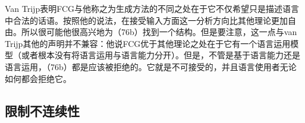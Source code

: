 Van Trijp表明FCG与他称之为生成方法的不同之处在于它不仅希望只是描述语言中合法的话语。按照他的说法，在接受输入方面这一分析方向比其他理论更加自由。所以很可能他很高兴地为（76b）找到一个结构。但是要注意，这一点与van Trijp其他的声明并不兼容：他说FCG优于其他理论之处在于它有一个语言运用模型（或者根本没有将语言运用与语言能力分开）。但是，不管是基于语言能力还是语言运用，（76b）都是应该被拒绝的。它就是不可接受的，并且语言使用者无论如何都会拒绝它。

\subsection{限制不连续性}
\label{sec-restricting-discont}

